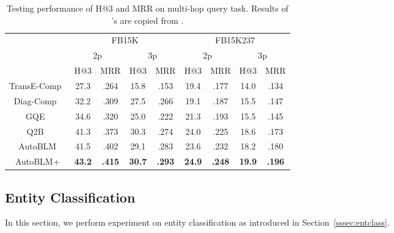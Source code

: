 \documentclass[10pt,journal,compsoc]{IEEEtran}
\begin{document}
\begin{table}[ht]
	\vspace{-5px}
	\caption{Testing performance of H@3 and MRR on multi-hop query task. Results of 's are copied from \cite{ren2019query2box}.}
	\label{tab:exp:query}
	\vspace{-10px}
	\centering
	\setlength\tabcolsep{2.5pt}
	\renewcommand{\arraystretch}{1.1}
	\begin{tabular}{c|cc|cc|cc|cc}
		\toprule
		& \multicolumn{4}{c|}{FB15K}                    & \multicolumn{4}{c}{FB15K237}                       \\ 
		& \multicolumn{2}{c|}{2p} & \multicolumn{2}{c|}{3p} & \multicolumn{2}{c|}{2p}	
		& \multicolumn{2}{c}{3p} \\ 
		& H@3        & MRR       &   H@3       &  MRR     &  H@3        & MRR        &  H@3        &  MRR         \\ \midrule 
		TransE-Comp~\cite{guu2015traversing}	&  27.3     &   .264    & 15.8 &  .153     &  19.4 &  .177   & 14.0 & .134  \\ 
		Diag-Comp~\cite{guu2015traversing}   &   32.2   &	  .309  &  27.5   & .266  &   19.1   &  .187   & 15.5  &   .147         \\  
		GQE~\cite{hamilton2018embedding}                      & 34.6       & .320      & 25.0      &  .222   & 21.3       &  .193     & 15.5      &  .145          \\ 
		Q2B~\cite{ren2019query2box}     & 41.3       & .373      & 30.3     &    .274     & 24.0     &    .225     & 18.6      &  .173        \\ \midrule
		AutoBLM			& 41.5	& .402	&  29.1 &	.283  &	 23.6	&  .232	 &	  18.2	&  .180	\\  
		AutoBLM+        &   \textbf{43.2}   &    \textbf{.415}  &   \textbf{30.7}   &    \textbf{.293}   &     \textbf{24.9}     &      \textbf{.248}   &  \textbf{19.9}     &  	\textbf{.196}    \\ \bottomrule
	\end{tabular}
\vspace{-10px}
\end{table}


\subsection{Entity Classification}
\label{sec:exp:cls}

In this section, we perform experiment on 
entity classification
as introduced in 
Section~\ref{sssec:entclass}.
\end{document}
